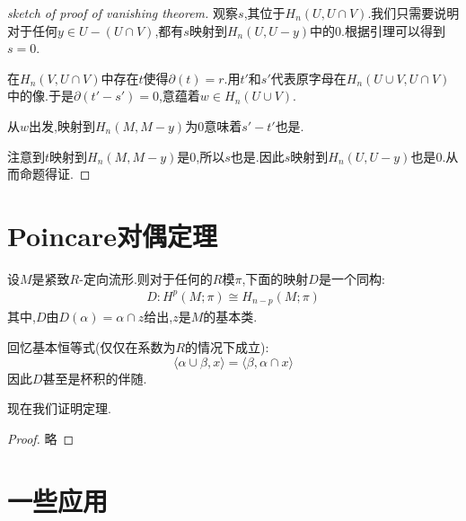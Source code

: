 \begin{proof}[sketch of proof of vanishing theorem]
    观察$s$,其位于$H_n(U,U\cap V)$.我们只需要说明对于任何$y \in U-(U\cap V)$,都有$s$映射到$H_n(U,U-y)$中的$0$.根据引理可以得到$s=0$.

    在$H_n(V,U\cap V)$中存在$t$使得$\partial(t)=r$.用$t'$和$s'$代表原字母在$H_n(U\cup V,U\cap V)$中的像.于是$\partial(t'-s')=0$,意蕴着$w \in H_n(U\cup V)$.

    从$w$出发,映射到$H_n(M,M-y)$为$0$意味着$s'-t'$也是.

    注意到$t$映射到$H_n(M,M-y)$是$0$,所以$s$也是.因此$s$映射到$H_n(U,U-y)$也是$0$.从而命题得证.
\end{proof}
\section{Poincare对偶定理}
\begin{theorem}[Poincare对偶定理]
    设$M$是紧致$R$-定向流形.则对于任何的$R$模$\pi$,下面的映射$D$是一个同构:
    \begin{align*}
        D:H^p(M;\pi)\cong H_{n-p}(M;\pi)
    \end{align*}
    其中,$D$由$D(\alpha)=\alpha \cap z$给出,$z$是$M$的基本类.
\end{theorem}
回忆基本恒等式(仅仅在系数为$R$的情况下成立):
$$
\langle \alpha \cup \beta,x\rangle=\langle \beta,\alpha \cap x\rangle
$$
因此$D$甚至是杯积的伴随.

现在我们证明定理.
\begin{proof}
    略
\end{proof}
\section{一些应用}
